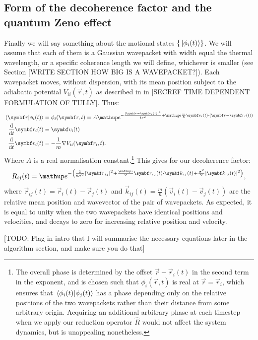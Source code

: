 \subsection{Form of the decoherence factor and the quantum Zeno effect}

Finally we will say something about the motional states $\{\ket{\phi_i(t)}\}$. We will assume that each of them is a Gaussian wavepacket with width equal the thermal wavelength, or a specific coherence length we will define, whichever is smaller (see Section [WRITE SECTION HOW BIG IS A WAVEPACKET?]). Each wavepacket moves, without dispersion, with its mean position subject to the adiabatic potential $V_{ii}(\vec r, t)$ as described in in [SECREF TIME DEPENDENT FORMULATION OF TULLY]. Thus:
\begin{align}
\braket{\vec r}{\phi_i(t)} &= \phi_i(\vec r, t) = A\ee^{-\frac{\abs{\vec r - \vec r_i(t)}^2}{4\sigma^2} + \ii \frac m\hbar \vec v_i(t)\cdot (\vec r - \vec r_i(t))}\\
\dv{t} \vec r_i(t) &= \vec v_i(t)\\
\dv{t} \vec v_i(t) &= -\frac1m\nabla V_{ii}(\vec r_i, t).
\end{align}
Where $A$ is a real normalisation constant.\footnote{The overall phase is determined by the offset $\vec r - \vec r_i(t)$ in the second term in the exponent, and is chosen such that $\phi_i(\vec r, t)$ is real at $\vec r=\vec r_i$, which ensures that $\braket{\phi_i(t)}{\phi_j(t)}$ has a phase depending only on the relative positions of the two wavepackets rather than their distance from some arbitrary origin. Acquiring an additional arbitrary phase at each timestep when we apply our reduction operator $\hat R$ would not affect the system dynamics, but is unappealing nonetheless.} This gives for our decoherence factor:
\begin{align}
R_{ij}(t) = \ee^{-\left(\frac1{8\sigma^2}\abs{\vec r_{ij}}^2
+ \frac\ii 2 \vec r_{ij}(t) \cdot \vec k_{ij}(t) + \frac{\sigma^2}{2} \abs{\vec k_{ij}(t)}^2
\right)},
\end{align}
where $\vec r_{ij}(t) = \vec r_i(t) - \vec r_j(t)$ and $\vec k_{ij}(t) = \frac m\hbar \left(\vec v_i(t) - \vec v_j(t)\right)$ are the relative mean position and wavevector of the pair of wavepackets. As expected, it is equal to unity when the two wavepackets have identical positions and velocities, and decays to zero for increasing relative position and velocity. 

[TODO: Flag in intro that I will summarise the necessary equations later in the algorithm section, and make sure you do that]

